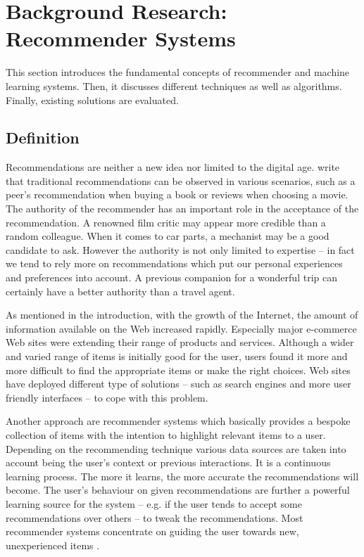 \chapter{Background Research: Recommender Systems}

This section introduces the fundamental concepts of recommender and machine learning systems. Then, it discusses different techniques as well as algorithms. Finally, existing solutions are evaluated.

\section{Definition}

Recommendations are neither a new idea nor limited to the digital age. \citet{ricci11} write that traditional recommendations can be observed in various scenarios, such as a peer's recommendation when buying a book or reviews when choosing a movie. The authority of the recommender has an important role in the acceptance of the recommendation. A renowned film critic may appear more credible than a random colleague. When it comes to car parts, a mechanist may be a good candidate to ask. However the authority is not only limited to expertise -- in fact we tend to rely more on recommendations which put our personal experiences and preferences into account. A previous companion for a wonderful trip can certainly have a better authority than a travel agent.

As mentioned in the introduction, with the growth of the Internet, the amount of information available on the Web increased rapidly. Especially major e-commerce Web sites were extending their range of products and services. Although a wider and varied range of items is initially good for the user, users found it more and more difficult to find the appropriate items or make the right choices. Web sites have deployed different type of solutions -- such as search engines and more user friendly interfaces -- to cope with this problem.

Another approach are recommender systems which basically provides a bespoke collection of items with the intention to highlight relevant items to a user. Depending on the recommending technique various data sources are taken into account being the user's context or previous interactions. It is a continuous learning process. The more it learns, the more accurate the recommendations will become. The user's behaviour on given recommendations are further a powerful learning source for the system -- e.g. if the user tends to accept some recommendations over others -- to tweak the recommendations. Most recommender systems concentrate on guiding the user towards new, unexperienced items \cite{ricci11}.

